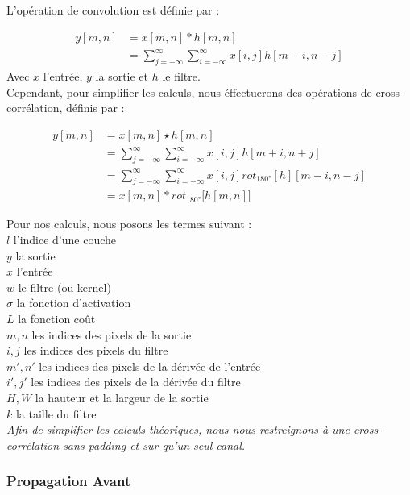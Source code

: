 \begin{multicols}{2}
L'opération de convolution est définie par : 

\begin{align}
y[m,n] &= x[m,n] * h[m,n]\\
&=\sum^{\infty }_{j=-\infty}\sum^{\infty }_{i=-\infty}x[i,j]h[m-i,n-j]
\end{align}
Avec $x$ l'entrée, $y$ la sortie et $h$ le filtre.\\

Cependant, pour simplifier les calculs, nous éffectuerons des opérations de cross-corrélation, définis par : 

\begin{align}
    y[m,n] &= x[m,n] \star h[m,n]\\
    &=\sum^{\infty }_{j=-\infty}\sum^{\infty }_{i=-\infty}x[i,j]h[m+i,n+j]\\
    &= \sum^{\infty }_{j=-\infty}\sum^{\infty }_{i=-\infty}x[i,j] rot_{\ang{180}}[h][m-i,n-j] \\
    &= x[m,n] * rot_{\ang{180}} \big[h[m,n] \big]
\end{align}

Pour nos calculs, nous posons les termes suivant : \\

$l$ l'indice d'une couche\\
$y$ la sortie\\
$x$ l'entrée\\
$w$ le filtre (ou kernel) \\
$\sigma$ la fonction d'activation\\
$L$ la fonction coût\\
$m,n$ les indices des pixels de la sortie\\
$i,j$ les indices des pixels du filtre\\
$m',n'$ les indices des pixels de la dérivée de l'entrée\\
$i',j'$ les indices des pixels de la dérivée du filtre\\
$H,W$ la hauteur et la largeur de la sortie\\
$k$ la taille du filtre \\

\textit{Afin de simplifier les calculs théoriques, nous nous restreignons à une cross-corrélation sans padding et sur qu'un seul canal.}\\

\subsubsection{Propagation Avant}


\end{multicols}

